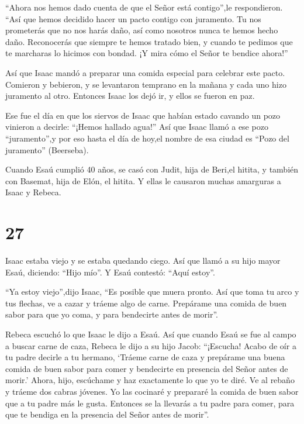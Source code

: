  ``Ahora nos hemos dado cuenta de que el Señor está
contigo'',le respondieron. ``Así que hemos decidido hacer un pacto
contigo con juramento.  Tu nos prometerás que no nos harás
daño, así como nosotros nunca te hemos hecho daño. Reconocerás que
siempre te hemos tratado bien, y cuando te pedimos que te marcharas lo
hicimos con bondad. ¡Y mira cómo el Señor te bendice ahora!''

 Así que Isaac mandó a preparar una comida especial para
celebrar este pacto. Comieron y bebieron,  y se levantaron
temprano en la mañana y cada uno hizo juramento al otro. Entonces Isaac
los dejó ir, y ellos se fueron en paz.

 Ese fue el día en que los siervos de Isaac que habían
estado cavando un pozo vinieron a decirle: ``¡Hemos hallado agua!''
 Así que Isaac llamó a ese pozo ``juramento'',y por eso
hasta el día de hoy,el nombre de esa ciudad es ``Pozo del juramento''
(Beerseba).

 Cuando Esaú cumplió 40 años, se casó con Judit, hija de
Beri,el hitita, y también con Basemat, hija de Elón, el hitita.
 Y ellas le causaron muchas amarguras a Isaac y Rebeca.

\hypertarget{section-26}{%
\section{27}\label{section-26}}

 Isaac estaba viejo y se estaba quedando ciego. Así que
llamó a su hijo mayor Esaú, diciendo: ``Hijo mío''. Y Esaú contestó:
``Aquí estoy''.

 ``Ya estoy viejo'',dijo Isaac, ``Es posible que muera
pronto.  Así que toma tu arco y tus flechas, ve a cazar y
tráeme algo de carne.  Prepárame una comida de buen sabor
para que yo coma, y para bendecirte antes de morir''.

 Rebeca escuchó lo que Isaac le dijo a Esaú. Así que cuando
Esaú se fue al campo a buscar carne de caza,  Rebeca le dijo
a su hijo Jacob: ``¡Escucha! Acabo de oír a tu padre decirle a tu
hermano,  `Tráeme carne de caza y prepárame una buena comida
de buen sabor para comer y bendecirte en presencia del Señor antes de
morir.'  Ahora, hijo, escúchame y haz exactamente lo que yo
te diré.  Ve al rebaño y tráeme dos cabras jóvenes. Yo las
cocinaré y prepararé la comida de buen sabor que a tu padre más le
gusta.  Entonces se la llevarás a tu padre para comer, para
que te bendiga en la presencia del Señor antes de morir''.

